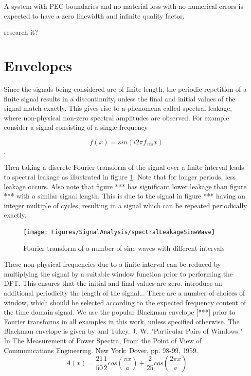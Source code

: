 A system with PEC boundaries and no material loss with no numerical errors is
expected to have a zero linewidth and infinite quality factor.


research it?

\section{Envelopes} Since the signals being considered are of finite length, the
periodic repetition of a finite signal results in a discontinuity, unless the
final and initial values of the signal match exactly. This gives rise to a
phenomena called spectral leakage, where non-physical non-zero spectral
amplitudes are observed. For example consider a signal consisting of a single
frequency

$$
f(x) = sin(i2 \pi f_{res} x)
$$
.

Then taking a discrete Fourier transform of the signal over a finite interval
leads to spectral leakage as illustrated in figure
\ref{fig:signal-analysis-speactral-leakage-sine-wave}. Note that for longer
periods, less leakage occurs. Also note that figure {***} has significant lower
leakage than figure {***} with a similar signal length. This is due to the
signal in figure {***} having an integer multiple of cycles, resulting in a
signal which can be repeated periodically exactly.

\begin{figure}
\begin{center}
    \texttt{[image: Figures/SignalAnalysis/spectralLeakageSineWave]}
\end{center}
\caption{Fourier transform of a number of sine waves with different intervals}
\label{fig:signal-analysis-speactral-leakage-sine-wave}
\end{figure}


These non-physical frequencies due to a finite interval can be reduced by
multiplying the signal by a suitable window function prior to performing the
DFT. This ensures that the initial and final values are zero. %
introduce an additional periodicity the length of the signal... There are a
number of choices of window, which should be selected according to the expected
frequency content of the time domain signal. We use the popular Blackman
envelope [***] prior to Fourier transforms in all examples in this work, unless
specified otherwise. The Blackman envelope is given by %
and Tukey, J. W. "Particular Pairs of Windows." In The Measurement of Power
Spectra, From the Point of View of Communications Engineering. New York: Dover,
pp. 98-99, 1959.
$$
A(x) = \frac{21}{50} \frac{1}{2} cos ( \frac{\pi x}{a} ) + \frac{2}{25} cos (
\frac{2 \pi x }{a} )
$$

